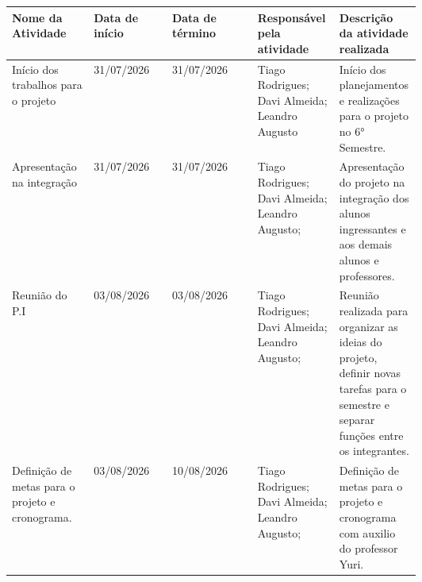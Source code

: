 \documentclass[
landscape,
  a4paper,
  12pt,
  english,
  brazilian,
]{article}
\begin{document}
 \begin{table}[]
\centering
 

\begin{tabular}{|>{\raggedright\arraybackslash}p{0.2\linewidth}|l|l|>{\raggedright\arraybackslash}p{0.2\linewidth}|>{\raggedright\arraybackslash}p{0.2\linewidth}|}
\hline
Nome da Atividade & Data de início & Data de término & Responsável pela atividade & Descrição da atividade realizada \\\hline
                  Início dos trabalhos para o projeto&                            31/07/2026&                31/07/2026&                  Tiago Rodrigues; Davi Almeida; Leandro Augusto&                                  Início dos planejamentos e realizações para o projeto no 6° Semestre.\\ \hline
                  Apresentação na integração&                            31/07/2026&                31/07/2026&                 Tiago Rodrigues; Davi Almeida; Leandro Augusto;&                                  Apresentação do projeto na integração dos alunos ingressantes e aos demais alunos e professores. \\ \hline 
 Reunião do P.I&                            03/08/2026&                03/08/2026&                 Tiago Rodrigues; Davi Almeida; Leandro Augusto;&                                 Reunião realizada para organizar as ideias do projeto, definir novas tarefas para o semestre e separar funções entre os integrantes.\\ \hline
                  Definição de metas para o projeto e cronograma.&                            03/08/2026&                10/08/2026&                 Tiago Rodrigues; Davi Almeida; Leandro Augusto;&                                  Definição de metas para o projeto e cronograma com auxilio do professor Yuri.\\ \hline
                 
\end{tabular}


\end{table}
\end{document}
